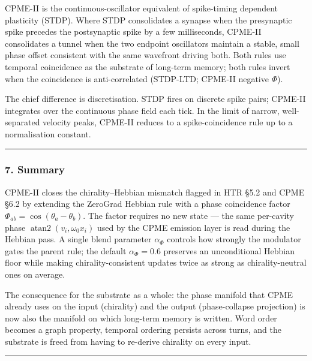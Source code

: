 \documentclass[
  11pt,
  a4paper,
]{article}
\begin{document}
CPME-II is the continuous-oscillator equivalent of spike-timing
dependent plasticity (STDP). Where STDP consolidates a synapse when the
presynaptic spike precedes the postsynaptic spike by a few milliseconds,
CPME-II consolidates a tunnel when the two endpoint oscillators maintain
a stable, small phase offset consistent with the same wavefront driving
both. Both rules use temporal coincidence as the substrate of long-term
memory; both rules invert when the coincidence is anti-correlated
(STDP-LTD; CPME-II negative \(\Phi\)).

The chief difference is discretisation. STDP fires on discrete spike
pairs; CPME-II integrates over the continuous phase field each tick. In
the limit of narrow, well-separated velocity peaks, CPME-II reduces to a
spike-coincidence rule up to a normalisation constant.

\begin{center}\rule{0.5\linewidth}{0.5pt}\end{center}

\subsubsection{7. Summary}\label{summary-1}

CPME-II closes the chirality--Hebbian mismatch flagged in HTR §5.2 and
CPME §6.2 by extending the ZeroGrad Hebbian rule with a phase
coincidence factor \(\Phi_{ab} = \cos(\theta_a - \theta_b)\). The factor
requires no new state --- the same per-cavity phase
\(\operatorname{atan2}(v_i, \omega_0 x_i)\) used by the CPME emission
layer is read during the Hebbian pass. A single blend parameter
\(\alpha_\Phi\) controls how strongly the modulator gates the parent
rule; the default \(\alpha_\Phi = 0.6\) preserves an unconditional
Hebbian floor while making chirality-consistent updates twice as strong
as chirality-neutral ones on average.

The consequence for the substrate as a whole: the phase manifold that
CPME already uses on the input (chirality) and the output
(phase-collapse projection) is now also the manifold on which long-term
memory is written. Word order becomes a graph property, temporal
ordering persists across turns, and the substrate is freed from having
to re-derive chirality on every input.

\newpage

\begin{center}\rule{0.5\linewidth}{0.5pt}\end{center}
\end{document}
